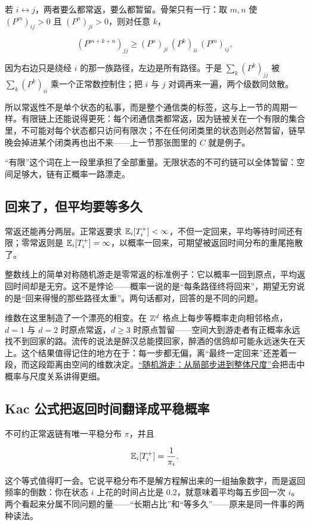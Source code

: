 若 \(i\leftrightarrow j\)，两者要么都常返，要么都暂留。骨架只有一行：取 \(m,n\) 使 \((P^m)_{ij}>0\) 且 \((P^n)_{ji}>0\)，则对任意 \(k\)，

\[
(P^{m+k+n})_{jj}\ge(P^n)_{ji}\,(P^k)_{ii}\,(P^m)_{ij},
\]

因为右边只是绕经 \(i\) 的那一族路径，左边是所有路径。于是 \(\sum_k(P^k)_{jj}\) 被 \(\sum_k(P^k)_{ii}\) 乘一个正常数控制住；把 \(i\) 与 \(j\) 对调再来一遍，两个级数同敛散。

所以常返性不是单个状态的私事，而是整个通信类的标签，这与上一节的周期一样。有限链上还能说得更死：每个闭通信类都常返，因为链被关在一个有限的集合里，不可能对每个状态都只访问有限次；不在任何闭类里的状态则必然暂留，链早晚会掉进某个闭类再也出不来——上一节那张图里的 \(C\) 就是例子。

``有限''这个词在上一段里承担了全部重量。无限状态的不可约链可以全体暂留：空间足够大，链有正概率一路漂走。

\subsection{回来了，但平均要等多久}

常返还能再分两层。正常返要求 \(\mathbb{E}_i[T_i^+]<\infty\)，不但一定回来，平均等待时间还有限；零常返则是 \(\mathbb{E}_i[T_i^+]=\infty\)，以概率一回来，可期望被返回时间分布的重尾拖散了。

整数线上的简单对称随机游走是零常返的标准例子：它以概率一回到原点，平均返回时间却是无穷。这不是悖论——概率一说的是``每条路径终将回来''，期望无穷说的是``回来得慢的那些路径太重''。两句话都对，回答的是不同的问题。

维数在这里制造了一个漂亮的相变。在 \(\mathbb{Z}^d\) 格点上每步等概率走向相邻格点，\(d=1\) 与 \(d=2\) 时原点常返，\(d\ge3\) 时原点暂留——空间大到游走者有正概率永远找不到回家的路。流传的说法是醉汉总能摸回家，醉酒的信鸽却可能永远迷失在天上。这个结果值得记住的地方在于：每一步都无偏，离``最终一定回来''还差着一段，而这段距离由空间的维数决定。\hyperref[sec:06-Random-Processes/04-Applications/01]{``随机游走：从局部步进到整体尺度''}会把击中概率与尺度关系讲得更细。

\subsection{Kac 公式把返回时间翻译成平稳概率}

不可约正常返链有唯一平稳分布 \(\pi\)，并且

\[
\mathbb{E}_i[T_i^+]=\frac1{\pi_i}.
\]

这个等式值得盯一会。它说平稳分布不是解方程解出来的一组抽象数字，而是返回频率的倒数：你在状态 \(i\) 上花的时间占比是 \(0.2\)，就意味着平均每五步回一次 \(i\)。两个看起来分属不同问题的量——``长期占比''和``等多久''——原来是同一件事的两种读法。

